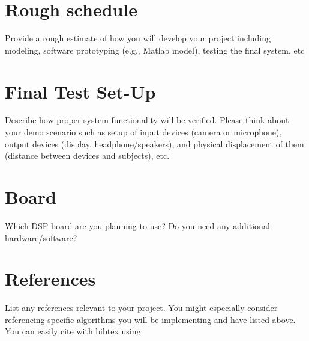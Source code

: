 \documentclass{article}
\begin{document}
\section{Rough schedule}
Provide a rough estimate of how you will develop your project including modeling, software prototyping (e.g., Matlab model), testing the final system, etc
 
\section{Final Test Set-Up}
Describe how proper system functionality will be verified. Please think about your demo scenario such as setup of input devices (camera or microphone), output devices (display, headphone/speakers), and physical displacement of them (distance between devices and subjects), etc. 

\section{Board}
Which DSP board are you planning to use? Do you need any additional hardware/software? 
 
\section{References}
List any references relevant to your project. You might especially consider referencing specific algorithms you will be implementing and have listed above. You can easily cite with bibtex using \cite{shan2004real}


\end{document}
